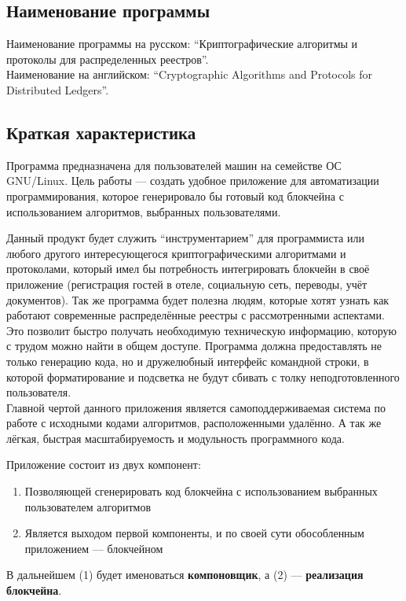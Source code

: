 \subsection{Наименование программы}
Наименование программы на русском:
``Криптографические алгоритмы и протоколы для распределенных реестров''. \\
Наименование на английском:
``Cryptographic Algorithms and Protocols for Distributed Ledgers''. \\

\subsection{Краткая характеристика}
Программа предназначена для пользователей машин на семействе ОС GNU/Linux.
Цель работы --- создать удобное приложение для автоматизации программирования,
которое генерировало бы готовый код блокчейна с использованием алгоритмов,
выбранных пользователями.

Данный продукт будет служить ``инструментарием'' для программиста или любого
другого интересующегося криптографическими алгоритмами и протоколами, который
имел бы потребность интегрировать блокчейн в своё приложение (регистрация
гостей в отеле, социальную сеть, переводы, учёт документов). Так же программа
будет полезна людям, которые хотят узнать как работают современные
распределённые реестры с рассмотренными
аспектами. Это позволит быстро получать необходимую техническую информацию,
которую с трудом можно найти в общем доступе. Программа должна предоставлять не
только генерацию кода, но и дружелюбный интерфейс командной строки, в которой
форматирование и подсветка не будут сбивать с толку неподготовленного
пользователя.\\

Главной чертой данного приложения является самоподдерживаемая система по работе
с исходными кодами алгоритмов, расположенными удалённо. А так же лёгкая,
быстрая масштабируемость и модульность программного кода.

Приложение состоит из двух компонент:
\begin{enumerate}
    \item Позволяющей сгенерировать код блокчейна с использованием выбранных
          пользователем алгоритмов
    \item Является выходом первой компоненты, и по своей сути обособленным приложением --- блокчейном
\end{enumerate}

В дальнейшем (1) будет именоваться \textbf{компоновщик}, а (2) --- \textbf{реализация блокчейна}. 
